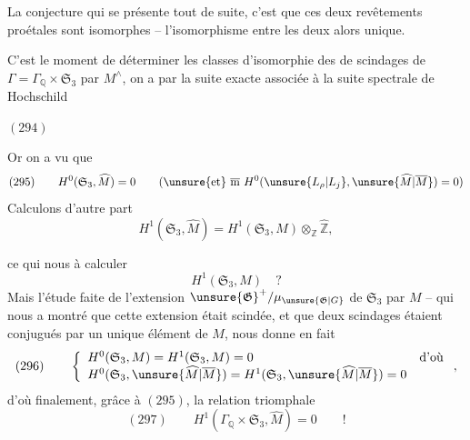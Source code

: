 La conjecture qui se présente tout de suite, c'est que ces deux revêtements proétales sont isomorphes -- l'isomorphisme entre les deux  alors unique.


 C'est le moment de déterminer les classes d'isomorphie des  de scindages de  $\Gamma=\Gamma_{\mathbb Q}\times\mathfrak S_3$ par $M^{\wedge}$, on a par la suite exacte associée à la suite spectrale de Hochschild

$(294)$\quad
{}

Or on a vu que
\[
(295)\qquad H^0(\mathfrak S_3,\widehat M)=0
\qquad(\text{\unsure{et} }\overline{\mathrm m}\ H^0(\unsure{L_\rho|L_j},\unsure{\widehat M|\overline M})=0)
\]
 Calculons d'autre part
\[
H^1(\mathfrak S_3,\widehat M)=H^1(\mathfrak S_3,M)\otimes_{\mathbb Z}\widehat{\mathbb Z},
\]




ce qui nous  à calculer
\[
H^1(\mathfrak S_3,M)\quad ?
\]
Mais l'étude faite de l'extension $\unsure{\mathfrak G}^+/\mu_{\unsure{\mathfrak G|G}}$ de $\mathfrak S_3$ par $M$ -- qui nous a montré que cette extension était scindée, et que deux scindages étaient conjugués par un unique élément de $M$, nous donne en fait
\[
(296)\qquad
\left\{\begin{array}{ll}
H^0(\mathfrak S_3,M)=H^1(\mathfrak S_3,M)=0&\text{d'où}\\
H^0(\mathfrak S_3,\unsure{\widehat M|\overline M})=H^1(\mathfrak S_3,\unsure{\widehat M|\overline M})=0&
\end{array}\right.
,
\]
d'où finalement, grâce à $(295)$, la relation triomphale
\[
(297)\qquad\boxed{H^1(\Gamma_{\mathbb Q}\times\mathfrak S_3,\widehat M)=0}\qquad !
\]

